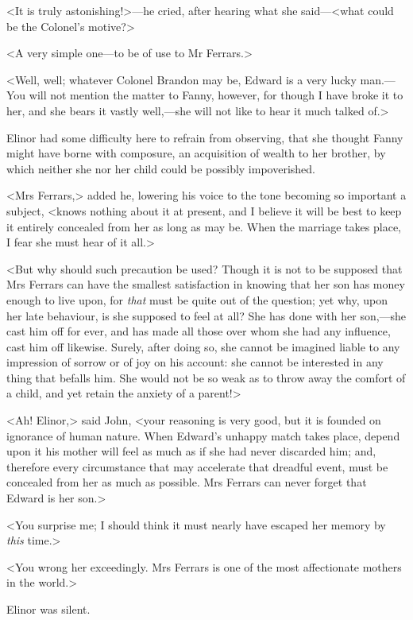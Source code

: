 <It is truly astonishing!>—he cried, after hearing what she said—<what could be the Colonel's motive?>

<A very simple one—to be of use to Mr Ferrars.>

<Well, well; whatever Colonel Brandon may be, Edward is a very lucky man.—You will not mention the matter to Fanny, however, for though I have broke it to her, and she bears it vastly well,—she will not like to hear it much talked of.>

Elinor had some difficulty here to refrain from observing, that she thought Fanny might have borne with composure, an acquisition of wealth to her brother, by which neither she nor her child could be possibly impoverished.

<Mrs Ferrars,> added he, lowering his voice to the tone becoming so important a subject, <knows nothing about it at present, and I believe it will be best to keep it entirely concealed from her as long as may be. When the marriage takes place, I fear she must hear of it all.>

<But why should such precaution be used? Though it is not to be supposed that Mrs Ferrars can have the smallest satisfaction in knowing that her son has money enough to live upon, for \textit{that} must be quite out of the question; yet why, upon her late behaviour, is she supposed to feel at all? She has done with her son,—she cast him off for ever, and has made all those over whom she had any influence, cast him off likewise. Surely, after doing so, she cannot be imagined liable to any impression of sorrow or of joy on his account: she cannot be interested in any thing that befalls him. She would not be so weak as to throw away the comfort of a child, and yet retain the anxiety of a parent!>

<Ah! Elinor,> said John, <your reasoning is very good, but it is founded on ignorance of human nature. When Edward's unhappy match takes place, depend upon it his mother will feel as much as if she had never discarded him; and, therefore every circumstance that may accelerate that dreadful event, must be concealed from her as much as possible. Mrs Ferrars can never forget that Edward is her son.>

<You surprise me; I should think it must nearly have escaped her memory by \textit{this} time.>

<You wrong her exceedingly. Mrs Ferrars is one of the most affectionate mothers in the world.>

Elinor was silent.

